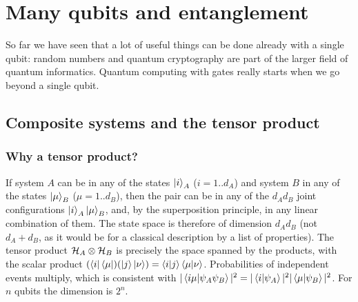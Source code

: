 \chapter{Many qubits and entanglement}\label{ch:entanglement}

So far we have seen that a lot of useful things can be done already with a single qubit: random numbers and quantum cryptography are part of the
larger field of quantum informatics. Quantum computing with gates really starts when we go beyond a single qubit.

\section{Composite systems and the tensor product}\label{sec:tensor}
\subsection{Why a tensor product?}
\begin{origin}
If system $A$ can be in any of the states $\left|i\right\rangle_A$ ($i=1..d_A$) and system $B$ in any of the states $\left|\mu\right\rangle_B$ ($\mu=1..d_B$), then the
pair can be in any of the $d_Ad_B$ joint configurations $\left|i\right\rangle_A\left|\mu\right\rangle_B$, and, by the superposition principle, in any linear combination of
them. The state space is therefore of dimension $d_Ad_B$ (not $d_A+d_B$, as it would be for a classical description by a list of properties).
The tensor product $\mathcal H_A\otimes\mathcal H_B$ is precisely the space spanned by the products, with the scalar product
$(\left\langle i\right|\left\langle\mu\right|)(\left|j\right\rangle\left|\nu\right\rangle)=\left\langle i\middle|j\right\rangle\left\langle\mu\middle|\nu\right\rangle$. Probabilities of independent events multiply, which is consistent with
$|\left\langle i\mu\middle|\psi_A\psi_B\right\rangle|^2=|\left\langle i\middle|\psi_A\right\rangle|^2|\left\langle\mu\middle|\psi_B\right\rangle|^2$. For $n$ qubits the dimension is $2^n$.
\end{origin}

